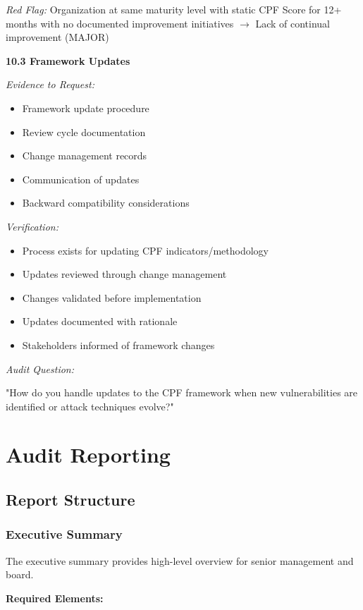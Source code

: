 \documentclass[11pt,a4paper]{article}
\begin{document}
\textit{Red Flag:} Organization at same maturity level with static CPF Score for 12+ months with no documented improvement initiatives $\rightarrow$ Lack of continual improvement (MAJOR)

\textbf{10.3 Framework Updates}

\textit{Evidence to Request:}
\begin{itemize}
\item Framework update procedure
\item Review cycle documentation
\item Change management records
\item Communication of updates
\item Backward compatibility considerations
\end{itemize}

\textit{Verification:}

\begin{itemize}
\item Process exists for updating CPF indicators/methodology
\item Updates reviewed through change management
\item Changes validated before implementation
\item Updates documented with rationale
\item Stakeholders informed of framework changes
\end{itemize}

\textit{Audit Question:}

"How do you handle updates to the CPF framework when new vulnerabilities are identified or attack techniques evolve?"

\section{Audit Reporting}

\subsection{Report Structure}

\subsubsection{Executive Summary}

The executive summary provides high-level overview for senior management and board.

\textbf{Required Elements:}
\end{document}
